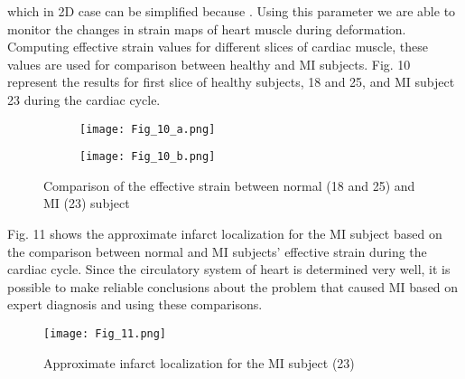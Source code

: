 \documentclass{jicspack}
\begin{document}
which in 2D case can be simplified because .  Using this parameter we are
able to monitor the changes in strain maps of heart muscle during deformation.
Computing effective strain values for different slices of cardiac muscle, these values are used
for comparison between healthy and MI subjects. Fig. 10 represent the results for
first slice of healthy subjects, 18 and 25, and MI subject 23 during the cardiac cycle.

\begin{figure}
\centering
\begin{subfigure}[b]{.45\textwidth}
\texttt{[image: Fig\_10\_a.png]}
\caption{}
\end{subfigure}

\begin{subfigure}[b]{0.45\textwidth}
\texttt{[image: Fig\_10\_b.png]}
\caption{}
\end{subfigure}
\caption{Comparison of the effective strain between normal (18 and 25) and MI (23) subject}
\end{figure}

Fig. 11 shows the approximate infarct localization for the MI subject based on the comparison between normal and MI subjects' effective strain during the cardiac cycle. Since the circulatory system of heart is determined very well, it is possible to make reliable conclusions about the problem that caused MI based on expert diagnosis and using these comparisons.  

\begin{figure}
\centering
\texttt{[image: Fig\_11.png]}
\caption{Approximate infarct localization for the MI subject (23)}
\end{figure}
\end{document}
